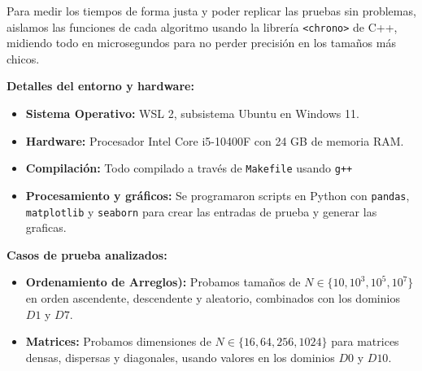 Para medir los tiempos de forma justa y poder replicar las pruebas sin problemas, aislamos las
funciones de cada algoritmo usando la librería \texttt{<chrono>} de C++, midiendo todo en
microsegundos para no perder precisión en los tamaños más chicos.

\textbf{Detalles del entorno y hardware:}
\begin{itemize}
\item \textbf{Sistema Operativo:} WSL 2, subsistema Ubuntu en Windows 11.
\item \textbf{Hardware:} Procesador Intel Core i5-10400F con 24 GB de memoria RAM.
\item \textbf{Compilación:} Todo compilado a través de \texttt{Makefile} usando \texttt{g++}
\item \textbf{Procesamiento y gráficos:} Se programaron scripts en Python con \texttt{pandas}, \texttt{matplotlib} y \texttt{seaborn} para crear las entradas de prueba y generar las graficas.
\end{itemize}

\textbf{Casos de prueba analizados:}
\begin{itemize}
    \item \textbf{Ordenamiento de Arreglos):} Probamos tamaños de $N \in \{10, 10^3, 10^5, 10^7\}$ en orden ascendente, descendente y aleatorio, combinados con los dominios $D1$ y $D7$.
    \item \textbf{Matrices:} Probamos dimensiones de $N \in \{16, 64, 256, 1024\}$ para matrices densas, dispersas y diagonales, usando valores en los dominios $D0$ y $D10$.
\end{itemize}
